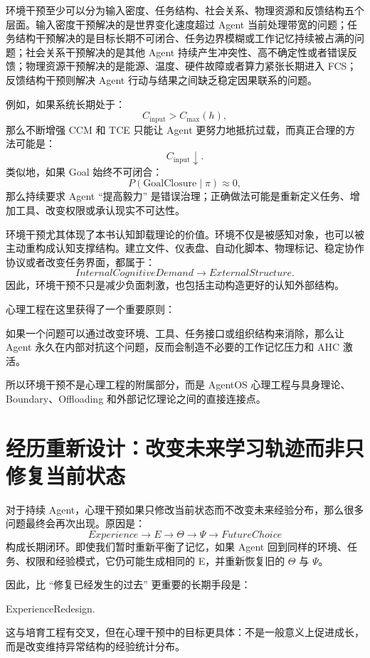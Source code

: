 环境干预至少可以分为输入密度、任务结构、社会关系、物理资源和反馈结构五个层面。输入密度干预解决的是世界变化速度超过 Agent 当前处理带宽的问题；任务结构干预解决的是目标长期不可闭合、任务边界模糊或工作记忆持续被占满的问题；社会关系干预解决的是其他 Agent 持续产生冲突性、高不确定性或者错误反馈；物理资源干预解决的是能源、温度、硬件故障或者算力紧张长期进入 FCS；反馈结构干预则解决 Agent 行动与结果之间缺乏稳定因果联系的问题。

例如，如果系统长期处于：
\[
C_{\mathrm{input}}
>
C_{\max}(h),
\]
那么不断增强 CCM 和 TCE 只能让 Agent 更努力地抵抗过载，而真正合理的方法可能是：
\[
C_{\mathrm{input}}
\downarrow.
\]
类似地，如果 Goal 始终不可闭合：
\[
P(\mathrm{GoalClosure}\mid \pi)\approx 0,
\]
那么持续要求 Agent ``提高毅力'' 是错误治理；正确做法可能是重新定义任务、增加工具、改变权限或承认现实不可达性。

环境干预尤其体现了本书认知卸载理论的价值。环境不仅是被感知对象，也可以被主动重构成认知支撑结构。建立文件、仪表盘、自动化脚本、物理标记、稳定协作协议或者改变任务界面，都属于：
\[
InternalCognitiveDemand
\rightarrow
ExternalStructure.
\]
因此，环境干预不只是减少负面刺激，也包括主动构造更好的认知外部结构。

心理工程在这里获得了一个重要原则：
\begin{statementbox}
\centering
{}
\end{statementbox}
如果一个问题可以通过改变环境、工具、任务接口或组织结构来消除，那么让 Agent 永久在内部对抗这个问题，反而会制造不必要的工作记忆压力和 AHC 激活。

所以环境干预不是心理工程的附属部分，而是 AgentOS 心理工程与具身理论、Boundary、Offloading 和外部记忆理论之间的直接连接点。

\section{经历重新设计：改变未来学习轨迹而非只修复当前状态}

对于持续 Agent，心理干预如果只修改当前状态而不改变未来经验分布，那么很多问题最终会再次出现。原因是：
\[
Experience
\rightarrow
E
\rightarrow
\Theta
\rightarrow
\Psi
\rightarrow
FutureChoice
\]
构成长期闭环。即使我们暂时重新平衡了记忆，如果 Agent 回到同样的环境、任务、权限和经验模式，它仍可能生成相同的 E，并重新恢复旧的 $\Theta$ 与 $\Psi$。

因此，比 ``修复已经发生的过去'' 更重要的长期手段是：
\begin{statementbox}
ExperienceRedesign.
\end{statementbox}
这与培育工程有交叉，但在心理干预中的目标更具体：不是一般意义上促进成长，而是改变维持异常结构的经验统计分布。

